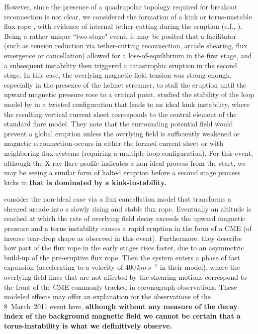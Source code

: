 \documentclass[namedreferences]{solarphysics}
\begin{document}
\begin{article}
However, since the presence of a quadrupolar topology required for breakout reconnection is not clear, we considered the formation of a kink or torus-unstable flux rope \cite{2004A&A...413L..27T,2010ApJ...708..314A}, with evidence of internal tether-cutting during the eruption (c.f., ). Being a rather unique ``two-stage" event, it may be posited that a facilitator (such as tension reduction via tether-cutting reconnection, arcade shearing, flux emergence or cancellation) allowed for a loss-of-equilibrium in the first stage, and a subsequent instability then triggered a catastrophic eruption in the second stage. In this case, the overlying magnetic field tension was strong enough, especially in the presence of the helmet streamer, to stall the eruption until the upward magnetic pressure rose to a critical point.  studied the stability of the loop model by  in a twisted configuration that leads to an ideal kink instability, where the resulting vertical current sheet corresponds to the central element of the standard flare model. They note that the surrounding potential field would prevent a global eruption unless the overlying field is sufficiently weakened or magnetic reconnection occurs in either the formed current sheet or with neighboring flux systems (requiring a multiple-loop configuration). For this event, although the X-ray flare profile indicates a non-ideal process from the start, we may be seeing a similar form of halted eruption before a second stage process kicks in {\bf that is dominated by a kink-instability.}

 consider the non-ideal case via a flux cancellation model that transforms a sheared arcade into a slowly rising and stable flux rope. Eventually an altitude is reached at which the rate of overlying field decay exceeds the upward magnetic pressure and a torus instability causes a rapid eruption in the form of a CME (of inverse tear-drop shape as observed in this event). Furthermore, they describe how part of the flux rope in the early stages rises faster, due to an asymmetric build-up of the pre-eruptive flux rope. Then the system enters a phase of fast expansion (accelerating to a velocity of $400\,km\,s^{-1}$ in their model), where the overlying field lines that are not affected by the shearing motions correspond to the front of the CME commonly tracked in coronagraph observations. These modeled effects may offer an explanation for the observations of the 8~March~2011 event here, {\bf although without any measure of the decay index of the background magnetic field we cannot be certain that a torus-instability is what we definitively observe.}



\end{article}
\end{document}
